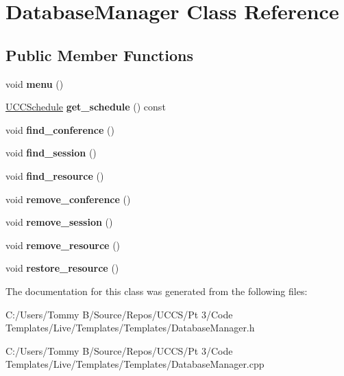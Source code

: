 \hypertarget{class_database_manager}{}\section{Database\+Manager Class Reference}
\label{class_database_manager}
\subsection*{Public Member Functions}
\begin{DoxyCompactItemize}
\item 
\mbox{\label{class_database_manager_af2aade5b44f41d76da7a45fc340fee47}} 
void {\bfseries menu} ()
\item 
\mbox{\label{class_database_manager_aec29b664c100048a1c02c2df4eec506b}} 
\hyperlink{class_u_c_c_schedule}{U\+C\+C\+Schedule} {\bfseries get\+\_\+schedule} () const
\item 
\mbox{\label{class_database_manager_a150d8ec849d6c6dc1a38f58274c1cf1b}} 
void {\bfseries find\+\_\+conference} ()
\item 
\mbox{\label{class_database_manager_a485ffb37b641c6f02acd8f3444b589b1}} 
void {\bfseries find\+\_\+session} ()
\item 
\mbox{\label{class_database_manager_a069228cc6ef2d5aad47cdd41a96be9b9}} 
void {\bfseries find\+\_\+resource} ()
\item 
\mbox{\label{class_database_manager_a1883656160d383dd47d028244c79a67f}} 
void {\bfseries remove\+\_\+conference} ()
\item 
\mbox{\label{class_database_manager_ab18894c8d03100ffd9a1267634df7ce2}} 
void {\bfseries remove\+\_\+session} ()
\item 
\mbox{\label{class_database_manager_a5b869f71ae94cde847bdd11456cf6052}} 
void {\bfseries remove\+\_\+resource} ()
\item 
\mbox{\label{class_database_manager_a9d5fadb956cc62b47e74452eb3422593}} 
void {\bfseries restore\+\_\+resource} ()
\end{DoxyCompactItemize}


The documentation for this class was generated from the following files\+:\begin{DoxyCompactItemize}
\item 
C\+:/\+Users/\+Tommy B/\+Source/\+Repos/\+U\+C\+C\+S/\+Pt 3/\+Code Templates/\+Live/\+Templates/\+Templates/Database\+Manager.\+h\item 
C\+:/\+Users/\+Tommy B/\+Source/\+Repos/\+U\+C\+C\+S/\+Pt 3/\+Code Templates/\+Live/\+Templates/\+Templates/Database\+Manager.\+cpp\end{DoxyCompactItemize}
